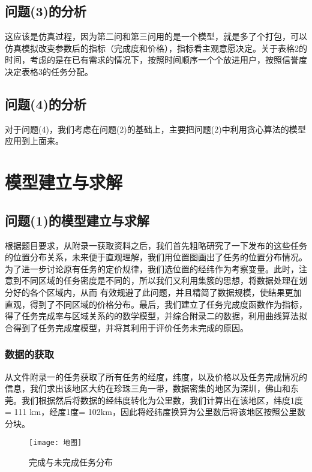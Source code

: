 \documentclass{ctexart}
\begin{document}
\subsection{问题(3)的分析}
这应该是仿真过程，因为第二问和第三问用的是一个模型，就是多了个打包，可以仿真模拟改变参数后的指标（完成度和价格），指标看主观意愿决定。关于表格2的时间，考虑的是在已有需求的情况下，按照时间顺序一个个放进用户，按照信誉度决定表格3的任务分配。
\subsection{问题(4)的分析}
对于问题(4)，我们考虑在问题(2)的基础上，主要把问题(2)中利用贪心算法的模型应用到上面来。




\section{模型建立与求解}
\subsection{问题(1)的模型建立与求解}
根据题目要求，从附录一获取资料之后，我们首先粗略研究了一下发布的这些任务的位置分布关系，未来便于直观理解，我们用位置图画出了任务的位置分布情况。为了进一步讨论原有任务的定价规律，我们选位置的经纬作为考察变量。此时，注意到不同区域的任务密度是不同的，所以我们又利用集簇的思想，将数据处理在划分好的各个区域内，从而 有效规避了此问题，并且精简了数据规模，使结果更加直观，得到了不同区域的价格分布。最后，我们建立了任务完成度函数作为指标，得了任务完成率与区域关系的的数学模型，并综合附录二的数据，利用曲线算法拟合得到了任务完成度模型，并将其利用于评价任务未完成的原因。
\subsubsection{数据的获取}
从文件附录一的任务获取了所有任务的经度，纬度，以及价格以及任务完成情况的信息，我们求出该地区大约在珍珠三角一带，数据密集的地区为深圳，佛山和东莞。我们根据然后将数据的经纬度转化为公里数，我们计算出在该地区，纬度1度= 111 km，经度1度= 102km，因此将经纬度换算为公里数后将该地区按照公里数分块。
\begin{figure}[htbp] 
\centering
\texttt{[image: 地图]} 
\caption{完成与未完成任务分布}
\end{figure}
\end{document}
